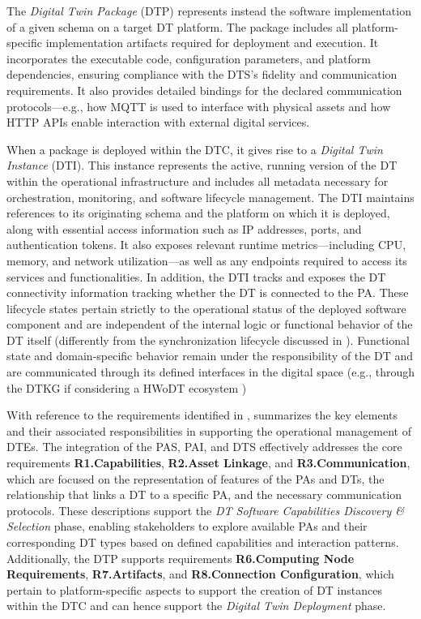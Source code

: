 The \textit{Digital Twin Package} (DTP) represents instead the software implementation of a given schema on a target \ac{DT} platform.
%
The package includes all platform-specific implementation artifacts required for deployment and execution.
%
It incorporates the executable code, configuration parameters, and platform dependencies, ensuring compliance with the DTS's fidelity and communication requirements.
%
It also provides detailed bindings for the declared communication protocols---e.g., how MQTT is used to interface with physical assets and how HTTP APIs enable interaction with external digital services.

When a package is deployed within the DTC, it gives rise to a \textit{Digital Twin Instance} (DTI).
%
This instance represents the active, running version of the DT within the operational infrastructure and includes all metadata necessary for orchestration, monitoring, and software lifecycle management.
The DTI maintains references to its originating schema and the platform on which it is deployed, along with essential access information such as IP addresses, ports, and authentication tokens. It also exposes relevant runtime metrics—including CPU, memory, and network utilization—as well as any endpoints required to access its services and functionalities.
%
In addition, the DTI tracks and exposes the \ac{DT} connectivity information tracking whether the \ac{DT} is connected to the \ac{PA}. These lifecycle states pertain strictly to the operational status of the deployed software component and are independent of the internal logic or functional behavior of the DT itself (differently from the synchronization lifecycle discussed in ).
%
Functional state and domain-specific behavior remain under the responsibility of the DT and are communicated through its defined interfaces in the digital space (e.g., through the \ac{DTKG} if considering a \ac{HWoDT} ecosystem )

With reference to the requirements identified in ,  summarizes the key elements and their associated responsibilities in supporting the operational management of \acp{DTE}.
%
The integration of the PAS, PAI, and DTS effectively addresses the core requirements \textbf{R1.Capabilities}, \textbf{R2.Asset Linkage}, and \textbf{R3.Communication}, which are focused on the representation of features of the \acp{PA} and \acp{DT}, the relationship that links a \ac{DT} to a specific \ac{PA}, and the necessary communication protocols.
%
These descriptions support the \emph{DT Software Capabilities Discovery \& Selection} phase, enabling stakeholders to explore available \acp{PA} and their corresponding DT types based on defined capabilities and interaction patterns.
%
Additionally, the DTP supports requirements \textbf{R6.Computing Node Requirements}, \textbf{R7.Artifacts}, and \textbf{R8.Connection Configuration}, which pertain to platform-specific aspects to support the creation of DT instances within the DTC and can hence support the \emph{Digital Twin Deployment} phase.

